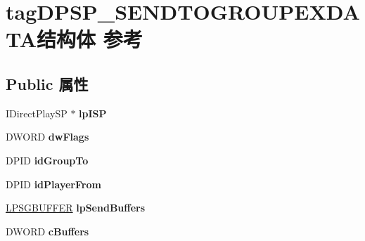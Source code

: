 \hypertarget{structtag_d_p_s_p___s_e_n_d_t_o_g_r_o_u_p_e_x_d_a_t_a}{}\section{tag\+D\+P\+S\+P\+\_\+\+S\+E\+N\+D\+T\+O\+G\+R\+O\+U\+P\+E\+X\+D\+A\+T\+A结构体 参考}
\label{structtag_d_p_s_p___s_e_n_d_t_o_g_r_o_u_p_e_x_d_a_t_a}
\subsection*{Public 属性}
\begin{DoxyCompactItemize}
\item 
\mbox{\label{structtag_d_p_s_p___s_e_n_d_t_o_g_r_o_u_p_e_x_d_a_t_a_aff770dbf269b2fa3c18f29e3f86f3010}} 
I\+Direct\+Play\+SP $\ast$ {\bfseries lp\+I\+SP}
\item 
\mbox{\label{structtag_d_p_s_p___s_e_n_d_t_o_g_r_o_u_p_e_x_d_a_t_a_a0a1af8ff66c5eff3372b0fa067e583d7}} 
D\+W\+O\+RD {\bfseries dw\+Flags}
\item 
\mbox{\label{structtag_d_p_s_p___s_e_n_d_t_o_g_r_o_u_p_e_x_d_a_t_a_a6a150e50cb228a443f0834e5eda0991c}} 
D\+P\+ID {\bfseries id\+Group\+To}
\item 
\mbox{\label{structtag_d_p_s_p___s_e_n_d_t_o_g_r_o_u_p_e_x_d_a_t_a_a09ae21f08b25867b1f1af36264cef878}} 
D\+P\+ID {\bfseries id\+Player\+From}
\item 
\mbox{\label{structtag_d_p_s_p___s_e_n_d_t_o_g_r_o_u_p_e_x_d_a_t_a_a15502456064be78a73628e1605d097ea}} 
\hyperlink{struct_s_g_b_u_f_f_e_r}{L\+P\+S\+G\+B\+U\+F\+F\+ER} {\bfseries lp\+Send\+Buffers}
\item 
\mbox{\label{structtag_d_p_s_p___s_e_n_d_t_o_g_r_o_u_p_e_x_d_a_t_a_a3b478c47f1e4f959cb5cce6fb34376ed}} 
D\+W\+O\+RD {\bfseries c\+Buffers}
\item 

\end{DoxyCompactItemize}
